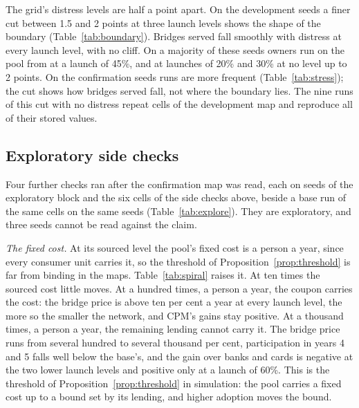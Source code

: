 The grid's distress levels are half a point apart. On the \NumSeedsDev{} development seeds a finer cut between 1.5 and 2
points at three launch levels shows the shape of the boundary (Table~\ref{tab:boundary}). Bridges served fall
smoothly with distress at every launch level, with no cliff. On a majority of these seeds owners run on the
pool from \BoundaryFortyFive{} at a launch of 45\%, and at launches of 20\% and 30\% at no level up to 2 points.
On the \NumSeeds{} confirmation seeds runs are more frequent (Table~\ref{tab:stress}); the cut shows how bridges served
fall, not where the boundary lies. The nine runs of this cut with no distress repeat cells of the development map
and reproduce all \BoundaryRepeatValues{} of their stored values.

\begin{table}[htbp]\centering\small
\resizebox{\linewidth}{!}{}
\caption{The stress boundary at an outside rate of 4.4\%: bridges served under CPM in years 4 and 5 (seed mean) and
the seeds where the pool is run, by distress level in steps of a tenth of a point and by launch participation.}
\label{tab:boundary}
\end{table}

\subsection{Exploratory side checks}

Four further checks ran after the confirmation map was read, each on \ExploreSeeds{} seeds of the exploratory
block and the six cells of the side checks above, beside a base run of the same cells on the same seeds
(Table~\ref{tab:explore}). They are exploratory, and three seeds cannot be read against the claim.

\emph{The fixed cost.} At its sourced level the pool's fixed cost is \SpiralCostSourced{} a person a year, since
every consumer unit carries it, so the threshold of Proposition~\ref{prop:threshold} is far from binding in
the maps. Table~\ref{tab:spiral} raises it. At ten times the sourced cost little moves. At a hundred times,
\SpiralCostHundred{} a person a year, the coupon carries the cost: the bridge price is above ten per cent a year at
every launch level, the more so the smaller the network, and CPM's gains stay positive. At a thousand times,
\SpiralCostThousand{} a person a year, the remaining lending cannot carry it. The bridge price runs from several
hundred to several thousand per cent, participation in years 4 and 5 falls well below the base's, and the gain over banks and cards is
negative at the two lower launch levels and positive only at a launch of 60\%. This is the threshold of
Proposition~\ref{prop:threshold} in simulation: the pool carries a fixed cost up to a bound set by its lending,
and higher adoption moves the bound.

